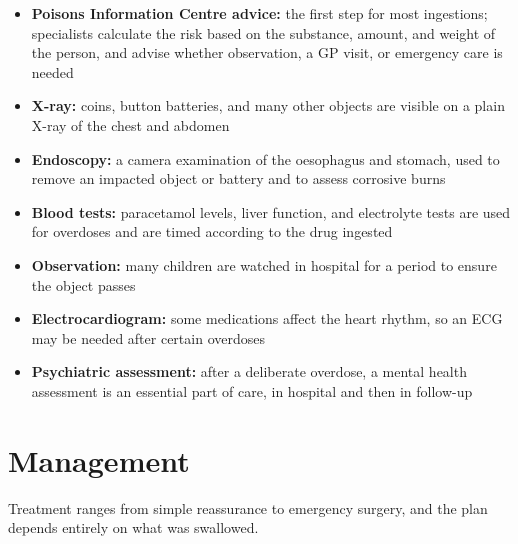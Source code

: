 \begin{itemize}
    \item \textbf{Poisons Information Centre advice:} the first step for most ingestions; specialists calculate the risk based on the substance, amount, and weight of the person, and advise whether observation, a GP visit, or emergency care is needed
    \item \textbf{X-ray:} coins, button batteries, and many other objects are visible on a plain X-ray of the chest and abdomen
    \item \textbf{Endoscopy:} a camera examination of the oesophagus and stomach, used to remove an impacted object or battery and to assess corrosive burns
    \item \textbf{Blood tests:} paracetamol levels, liver function, and electrolyte tests are used for overdoses and are timed according to the drug ingested
    \item \textbf{Observation:} many children are watched in hospital for a period to ensure the object passes
    \item \textbf{Electrocardiogram:} some medications affect the heart rhythm, so an ECG may be needed after certain overdoses
    \item \textbf{Psychiatric assessment:} after a deliberate overdose, a mental health assessment is an essential part of care, in hospital and then in follow-up
\end{itemize}

\section*{Management}
Treatment ranges from simple reassurance to emergency surgery, and the plan depends entirely on what was swallowed.

